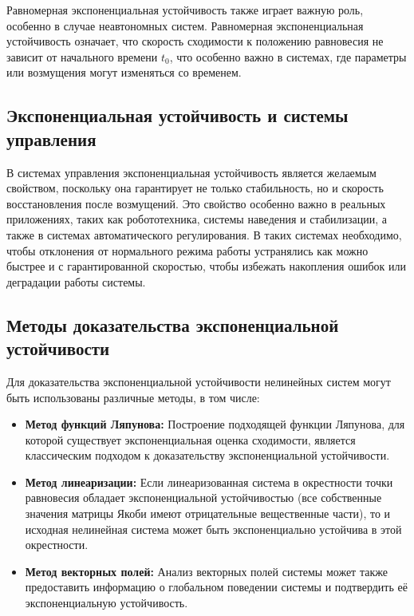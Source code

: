 \documentclass[a4paper,14pt]{extarticle} %
\begin{document}
Равномерная экспоненциальная устойчивость также играет важную роль, особенно в случае неавтономных систем. Равномерная экспоненциальная устойчивость означает, что скорость сходимости к положению равновесия не зависит от начального времени \(t_0\), что особенно важно в системах, где параметры или возмущения могут изменяться со временем.

\subsection{Экспоненциальная устойчивость и системы управления}

В системах управления экспоненциальная устойчивость является желаемым свойством, поскольку она гарантирует не только стабильность, но и скорость восстановления после возмущений. Это свойство особенно важно в реальных приложениях, таких как робототехника, системы наведения и стабилизации, а также в системах автоматического регулирования. В таких системах необходимо, чтобы отклонения от нормального режима работы устранялись как можно быстрее и с гарантированной скоростью, чтобы избежать накопления ошибок или деградации работы системы.

\subsection{Методы доказательства экспоненциальной устойчивости}

Для доказательства экспоненциальной устойчивости нелинейных систем могут быть использованы различные методы, в том числе:
\begin{itemize}
    \item \textbf{Метод функций Ляпунова:} Построение подходящей функции Ляпунова, для которой существует экспоненциальная оценка сходимости, является классическим подходом к доказательству экспоненциальной устойчивости.
    \item \textbf{Метод линеаризации:} Если линеаризованная система в окрестности точки равновесия обладает экспоненциальной устойчивостью (все собственные значения матрицы Якоби имеют отрицательные вещественные части), то и исходная нелинейная система может быть экспоненциально устойчива в этой окрестности.
    \item \textbf{Метод векторных полей:} Анализ векторных полей системы может также предоставить информацию о глобальном поведении системы и подтвердить её экспоненциальную устойчивость.
\end{itemize}
\end{document}
